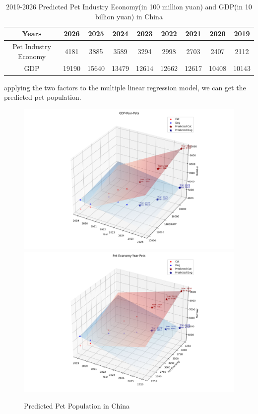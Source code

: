 \documentclass[withoutpreface,bwprint]{cumcmthesis} %
\begin{document}
\begin{table}[!htbp]
    \small
    \caption{2019-2026 Predicted Pet Industry Economy(in 100 million yuan) and GDP(in 10 billion yuan) in China} \centering
    \begin{tabular}{ccccccccc}
    \toprule[1.5pt]
    Years & 2026 & 2025 & 2024 & 2023 & 2022 & 2021 & 2020 & 2019 \\
    \midrule[1pt]
    Pet Industry Economy & 4181 & 3885 & 3589 & 3294 & 2998 & 2703 & 2407 & 2112 \\
    GDP & 19190 & 15640 & 13479 & 12614 & 12662 & 12617 & 10408 & 10143 \\
    \bottomrule[1.5pt]
    \end{tabular}
\end{table}
\par applying the two factors to the multiple linear regression model,
we can get the predicted pet population.
\clearpage
\begin{figure}[htbp]
	\centering
	\includegraphics[width=.99\textwidth]{Figure_11}
	\includegraphics[width=.99\textwidth]{Figure_12}
	\caption{Predicted Pet Population in China}
\end{figure}
\end{document}
